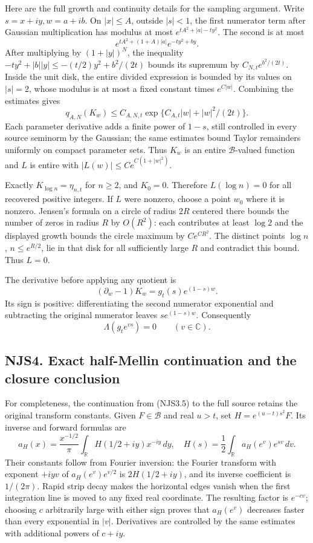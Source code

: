 Here are the full growth and continuity details for the sampling
argument. Write \(s=x+iy,w=a+ib\). On \(|x|\le A\), outside \(|s|<1\),
the first numerator term after Gaussian multiplication has modulus at
most \(e^{tA^2+|a|-ty^2}\). The second is at most \[
e^{tA^2+(1+A)|a|}e^{-ty^2+by}.
\] After multiplying by \((1+|y|)^N\), the inequality
\(-ty^2+|b||y|\le-(t/2)y^2+b^2/(2t)\) bounds its supremum by
\(C_{N,t}e^{b^2/(2t)}\). Inside the unit disk, the entire divided
expression is bounded by its values on \(|s|=2\), whose modulus is at
most a fixed constant times \(e^{C|w|}\). Combining the estimates gives
\[
q_{A,N}(K_w)\le C_{A,N,t}
\exp\{C_{A,t}|w|+|w|^2/(2t)\}.
\tag{NJS3.3}
\] Each parameter derivative adds a finite power of \(1-s\), still
controlled in every source seminorm by the Gaussian; the same estimates
bound Taylor remainders uniformly on compact parameter sets. Thus
\(K_w\) is an entire \(\mathcal B\)-valued function and \(L\) is entire
with \(|L(w)|\le Ce^{C(1+|w|^2)}\).

Exactly \(K_{\log n}=\eta_{n,t}\) for \(n\ge2\), and \(K_0=0\).
Therefore \(L(\log n)=0\) for all recovered positive integers. If \(L\)
were nonzero, choose a point \(w_0\) where it is nonzero. Jensen's
formula on a circle of radius \(2R\) centered there bounds the number of
zeros in radius \(R\) by \(O(R^2)\): each contributes at least \(\log2\)
and the displayed growth bounds the circle maximum by \(Ce^{CR^2}\). The
distinct points \(\log n\), \(n\le e^{R/2}\), lie in that disk for all
sufficiently large \(R\) and contradict this bound. Thus \(L=0\).

The derivative before applying any quotient is \[
(\partial_w-1)K_w=g_t(s)e^{(1-s)w}.
\tag{NJS3.4}
\] Its sign is positive: differentiating the second numerator
exponential and subtracting the original numerator leaves
\(s e^{(1-s)w}\). Consequently \[
\Lambda(g_te^{vs})=0\qquad(v\in\mathbb C).
\tag{NJS3.5}
\]

\subsection{NJS4. Exact half-Mellin continuation and the closure
conclusion}\label{njs4.-exact-half-mellin-continuation-and-the-closure-conclusion}

For completeness, the continuation from (NJS3.5) to the full source
retains the original transform constants. Given \(F\in\mathcal B\) and
real \(u>t\), set \(H=e^{(u-t)s^2}F\). Its inverse and forward formulas
are \[
a_H(x)=\frac{x^{-1/2}}\pi\int_{\mathbb R}H(1/2+iy)x^{-iy}\,dy,
\quad
H(s)=\frac12\int_{\mathbb R}a_H(e^v)e^{sv}\,dv.
\tag{NJS4.1}
\] Their constants follow from Fourier inversion: the Fourier transform
with exponent \(+iyv\) of \(a_H(e^v)e^{v/2}\) is \(2H(1/2+iy)\), and its
inverse coefficient is \(1/(2\pi)\). Rapid strip decay makes the
horizontal edges vanish when the first integration line is moved to any
fixed real coordinate. The resulting factor is \(e^{-cv}\); choosing
\(c\) arbitrarily large with either sign proves that \(a_H(e^v)\)
decreases faster than every exponential in \(|v|\). Derivatives are
controlled by the same estimates with additional powers of \(c+iy\).

